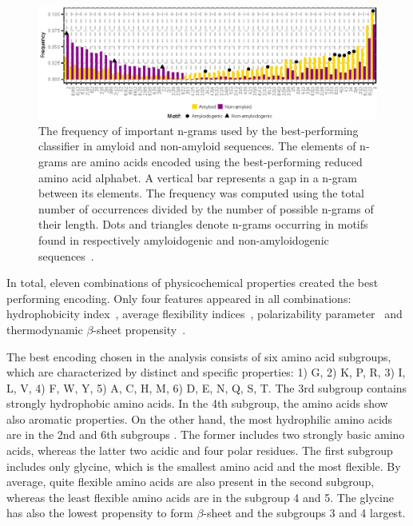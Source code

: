 \documentclass[fleqn,10pt,twoside]{gcb15submission}
\begin{document}
\begin{figure}[!tpb]
\centerline{\includegraphics{figures/ngrams.eps}}
\caption{The frequency of important n-grams used by the best-performing 
classifier in amyloid and non-amyloid sequences. The elements of n-grams are 
amino acids encoded using the best-performing reduced amino acid alphabet. A vertical bar represents a gap in a n-gram between 
its elements. The frequency was computed using the total number of occurrences 
divided by the number of possible n-grams of their length. Dots and triangles 
denote n-grams occurring in motifs found in respectively amyloidogenic and 
non-amyloidogenic sequences~\citep{lopez_de_la_paz_sequence_2004}.}\label{fig:ngrams} 
\end{figure}
%
%
%

In total, eleven combinations of physicochemical properties created the best 
performing encoding. Only four features appeared in all combinations: 
hydrophobicity index~\citep{argos_structural_1982}, average flexibility 
indices~\citep{bhaskaran_positional_1988}, polarizability 
parameter~\citep{charton_structural_1982} and thermodynamic $\beta$-sheet 
propensity~\citep{kim_thermodynamic_1993}.

  The best encoding chosen in the analysis consists of six amino acid subgroups, 
which are characterized by distinct and specific properties: 1) G, 2) K, P, R, 
3) I, L, V, 4) F, W, Y, 5) A, C, H, M, 6) D, E, N, Q, S, T. The 3rd subgroup contains strongly hydrophobic amino 
acids. In the 4th subgroup, the amino acids show also aromatic properties. On 
the other hand, the most hydrophilic amino acids are in the 2nd and 6th 
subgroups . The former includes two strongly basic amino acids, whereas the latter 
%
%
%
%
%
two acidic and four polar residues. The first subgroup includes only glycine, 
which is the smallest amino acid and the most flexible.  By average, quite 
flexible amino acids are also present in the second subgroup, whereas the least 
flexible amino acids are in the subgroup 4 and 5. The glycine has also the 
lowest propensity to form $\beta$-sheet and the subgroups 3 and 4 largest. 
\end{document}
